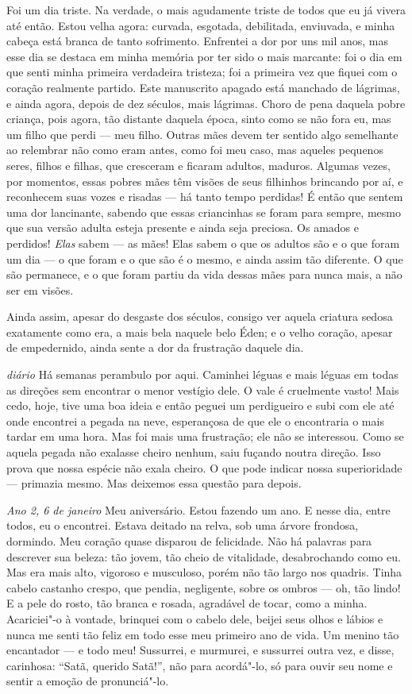 Foi um dia triste. Na verdade, o mais agudamente triste de todos que eu já
vivera até então. Estou velha agora: curvada, esgotada,
debilitada, enviuvada, e minha cabeça está branca de tanto sofrimento. Enfrentei
a dor por uns mil anos, mas esse dia se destaca em minha memória por ter sido
o mais marcante: foi o dia em que senti minha primeira verdadeira tristeza; foi a
primeira vez que fiquei com o coração realmente partido. Este manuscrito apagado
está manchado de lágrimas, e ainda agora, depois de dez séculos, mais lágrimas.
Choro de pena daquela pobre criança, pois agora, tão distante
daquela época, sinto como se não fora eu, mas um filho que perdi --- 
meu filho. Outras mães devem ter sentido algo semelhante ao relembrar não como
eram antes, como foi meu caso, mas aqueles pequenos seres,
filhos e filhas, que cresceram e ficaram adultos, maduros. Algumas vezes,
por momentos, essas pobres mães têm visões de seus filhinhos brincando por aí, e
reconhecem suas vozes e risadas --- há tanto tempo perdidas! É então que
sentem uma dor lancinante, sabendo que essas criancinhas se foram para sempre,
mesmo que sua versão adulta esteja presente e ainda seja preciosa. Os amados e
perdidos! \textit{Elas} sabem --- as mães! Elas sabem o que os adultos são e o que
foram um dia --- o que foram e o que são é o mesmo, e ainda assim tão diferente. O
que são permanece, e o que foram partiu da vida dessas mães para nunca mais, a
não ser em visões.

Ainda assim, apesar do desgaste dos séculos, consigo ver aquela criatura sedosa
exatamente como era, a mais bela naquele belo Éden; e o velho coração, apesar
de empedernido, ainda sente a dor da frustração daquele dia.

\textit{diário} Há semanas perambulo por aqui. Caminhei léguas e mais léguas em todas as
direções sem encontrar o menor vestígio dele. O vale é cruelmente vasto! Mais cedo,
hoje, tive uma boa ideia e então peguei um perdigueiro e subi com ele até onde
encontrei a pegada na neve, esperançosa de que ele o encontraria o mais tardar em uma hora. Mas foi mais uma frustração;
ele não se interessou. Como se aquela pegada não exalasse cheiro nenhum, saiu
fuçando noutra direção. Isso prova que nossa espécie não exala cheiro. O
que pode indicar nossa superioridade --- primazia mesmo. Mas deixemos essa questão para depois.

\textit{Ano 2, 6 de janeiro} Meu aniversário. Estou fazendo um ano. E nesse dia, entre
todos, eu o encontrei. Estava deitado na relva, sob uma árvore frondosa, dormindo.
Meu coração quase disparou de felicidade. Não há palavras para descrever
sua beleza: tão jovem, tão cheio de vitalidade, desabrochando como eu. Mas era mais
alto, vigoroso e musculoso, porém não tão largo nos quadris. Tinha cabelo
castanho crespo, que pendia, negligente, sobre os ombros --- oh, tão lindo! E a pele
do rosto, tão branca e rosada, agradável de tocar, como a minha. Acariciei"-o à
vontade, brinquei com o cabelo dele, beijei seus olhos e lábios e nunca me
senti tão feliz em todo esse meu primeiro ano de vida. Um menino tão encantador
--- e todo meu! Sussurrei, e murmurei, e sussurrei outra vez, e disse,
carinhosa: “Satã, querido Satã!”, não para acordá"-lo, só para ouvir seu
nome e sentir a emoção de pronunciá"-lo.

